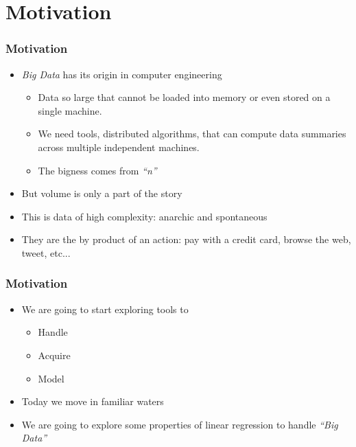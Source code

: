 \documentclass[
  shownotes,
  xcolor={svgnames},
  hyperref={colorlinks,citecolor=DarkBlue,linkcolor=DarkRed,urlcolor=DarkBlue}
  ]{beamer}
\begin{document}
\section{Motivation}
\begin{frame}
\frametitle{Motivation}

\begin{itemize}
  \item {\it Big Data} has its origin in computer engineering
  \begin{itemize}
    \item Data so large that cannot be loaded into memory or even stored on a single machine.
    \item We need tools, distributed algorithms, that can compute data summaries across multiple independent machines. 
    \item The bigness comes from {\it ``n''}
  \end{itemize}
  \bigskip
  \item But volume is only a part of the story
  \bigskip
  \item This is data of high complexity: anarchic and spontaneous
  \bigskip
  \item They are the by product of an action: pay with a credit card, browse the web, tweet, etc...



\end{itemize}
\end{frame}

\begin{frame}
\frametitle{Motivation}

\begin{itemize}
  \item We are going to start exploring tools to
  \begin{itemize}
    \item Handle 
    \medskip
    \item Acquire
    \medskip
    \item Model 
   \end{itemize}
   \bigskip
  \item Today we move in familiar waters
  \bigskip
  \item We are going to explore some properties of linear regression to  handle {\it ``Big Data''}

\end{itemize}
\end{frame}
\end{document}
